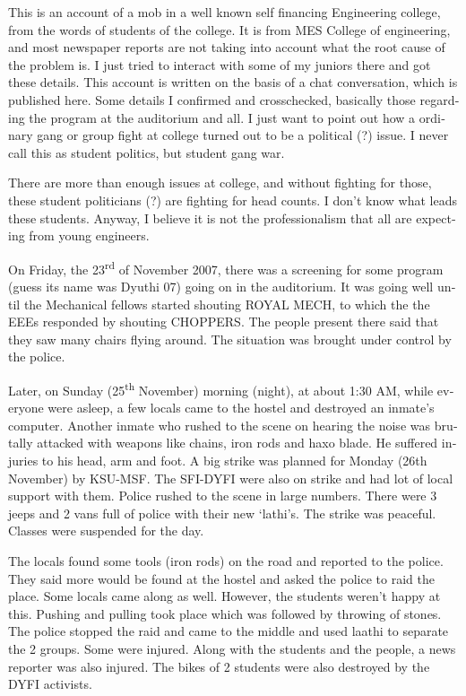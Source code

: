 \vskip 2pt
\begin{english}
This is an account of a mob in a well known self financing Engineering college, from the words of students of the college. It is from MES College of engineering, and most newspaper reports are not taking into account what the root cause of the problem is. I just tried to interact with some of my juniors there and got these details. This account is written on the basis of a chat conversation, which is published here. Some details I confirmed and crosschecked, basically those regarding the program at the auditorium and all. I just want to point out how a ordinary gang or group fight at college turned out to be a political (?) issue. I never call this as student politics, but student gang war.

There are more than enough issues at college, and without fighting for those, these student politicians (?) are fighting for head counts. I don’t know what leads these students. Anyway, I believe it is not the professionalism that all are expecting from young engineers.

On Friday, the 23\textsuperscript{rd} of November 2007, there was a screening for some program (guess its name was Dyuthi 07) going on in the auditorium. It was going well until the Mechanical fellows started shouting ROYAL MECH, to which the the EEEs responded by shouting CHOPPERS. The people present there said that they saw many chairs flying around. The situation was brought under control by the police.

Later, on Sunday (25\textsuperscript{th} November) morning (night), at about 1:30 AM, while everyone were asleep, a few locals came to the hostel and destroyed an inmate’s computer. Another inmate who rushed to the scene on hearing the noise was brutally attacked with weapons like chains, iron rods and haxo blade. He suffered injuries to his head, arm and foot.
A big strike was planned for Monday (26th November) by KSU-MSF. The SFI-DYFI were also on strike and had lot of local support with them. Police rushed to the scene in large numbers. There were 3 jeeps and 2 vans full of police with their new ‘lathi’s. The strike was peaceful. Classes were suspended for the day.

The locals found some tools (iron rods) on the road and reported to the police. They said more would be found at the hostel and asked the police to raid the place. Some locals came along as well. However, the students weren't happy at this. Pushing and pulling took place which was followed by throwing of stones. The police stopped the raid and came to the middle and used laathi to separate the 2 groups. Some were injured.
Along with the students and the people, a news reporter was also injured. The bikes of 2 students were also destroyed by the DYFI activists.


\end{english}
